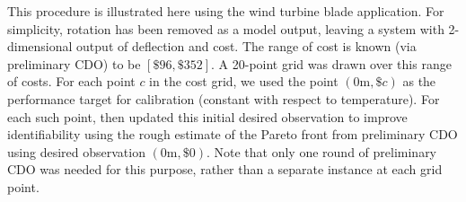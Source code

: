\documentclass{article}
\begin{document}
This procedure is illustrated here using the wind turbine blade application.
%
For simplicity, rotation has been removed as a model output, leaving a system with 2-dimensional output of deflection and cost. 
%
The range of cost is known (via preliminary CDO) to be $[\$96,\$352]$.
%
A 20-point grid was drawn over this range of costs. 
%
%
For each point $c$ in the cost grid, we used the point $(0\mathrm m,\$c)$ as the performance target for calibration (constant with respect to temperature).
%
For each such point, then updated this initial desired observation to improve identifiability using the rough estimate of the Pareto front from preliminary CDO using desired observation $(0\mathrm m,\$0)$.
%
Note that only one round of preliminary CDO was needed for this purpose, rather than a separate instance at each grid point.
%
%
%
\end{document}
